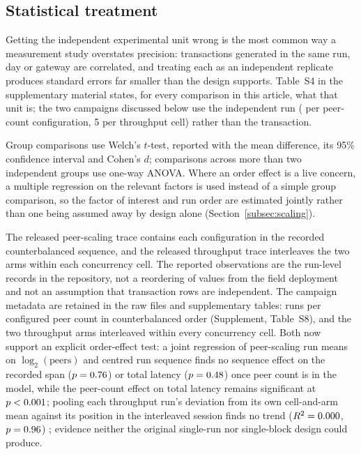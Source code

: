 \documentclass[a4paper,fleqn]{cas-sc}
\begin{document}
\subsection{Statistical treatment}
\label{subsec:stats}

Getting the independent experimental unit wrong is the most common way a
measurement study overstates precision: transactions generated in the same
run, day or gateway are correlated, and treating each as an independent
replicate produces standard errors far smaller than the design supports.
Table~S4 in the supplementary material states, for every comparison in
this article, what that unit is; the two campaigns discussed below use the
independent run (\PartRunsPerConfig{} per peer-count configuration, 5 per
throughput cell) rather than the transaction.

Group comparisons use Welch's $t$-test, reported with the mean difference,
its 95\% confidence interval and Cohen's $d$; comparisons across more than
two independent groups use one-way ANOVA. Where an order effect is a live
concern, a multiple regression on the relevant factors is used instead of a
simple group comparison, so the factor of interest and run order are
estimated jointly rather than one being assumed away by design alone
(Section~\ref{subsec:scaling}).

The released peer-scaling trace contains each configuration in the recorded
counterbalanced sequence, and the released throughput trace interleaves the
two arms within each concurrency cell. The reported observations are the
run-level records in the repository, not a reordering of values from the
field deployment and not an assumption that transaction rows are
independent. The campaign metadata are retained in the raw files and
supplementary tables: \PartRunsPerConfig{} runs per configured peer count in
counterbalanced order (Supplement, Table~S8), and the two throughput arms
interleaved within every concurrency cell. Both now support an explicit
order-effect
test: a joint regression of peer-scaling run means on $\log_2(\text{peers})$
and centred run sequence finds no sequence effect on the recorded span
($p=0.76$) or total latency ($p=0.48$) once
peer count is in the model, while the peer-count effect on total latency
remains significant at $p<0.001$; pooling each throughput
run's deviation from its own cell-and-arm mean against its position in the
interleaved session finds no trend ($R^2=0.000$, $p=0.96$)
; evidence
neither the original single-run nor single-block design could produce.
\end{document}
